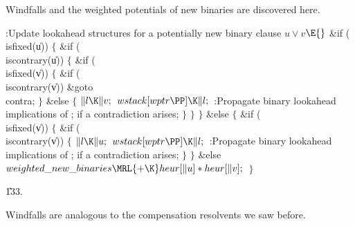 Windfalls and the weighted potentials of new binaries are
discovered here.

\Y\B\4:Update lookahead structures for a potentially new binary clause $u%
\lor v$\X${}\E{}$\6
\&{if} (\\{isfixed}(\|u))\5
${}\{{}$\1\6
\&{if} (\\{iscontrary}(\|u))\5
${}\{{}$\1\6
\&{if} (\\{isfixed}(\|v))\5
${}\{{}$\1\6
\&{if} (\\{iscontrary}(\|v))\1\5
\&{goto} \\{contra};\2\6
\4${}\}{}$\5
\2\&{else}\5
${}\{{}$\1\6
${}\|l\K\|v;{}$\6
${}\\{wstack}[\\{wptr}\PP]\K\|l;{}$\6
:Propagate binary lookahead implications of ;  if a contradiction arises\X;\6
\4${}\}{}$\2\6
\4${}\}{}$\2\6
\4${}\}{}$\5
\2\&{else}\5
${}\{{}$\1\6
\&{if} (\\{isfixed}(\|v))\5
${}\{{}$\1\6
\&{if} (\\{iscontrary}(\|v))\5
${}\{{}$\1\6
${}\|l\K\|u;{}$\6
${}\\{wstack}[\\{wptr}\PP]\K\|l;{}$\6
:Propagate binary lookahead implications of ;  if a contradiction arises\X;\6
\4${}\}{}$\2\6
\4${}\}{}$\5
\2\&{else}\1\5
${}\\{weighted\_new\_binaries}\MRL{+{\K}}\\{heur}[\|u]*\\{heur}[\|v];{}$\2\6
\4${}\}{}$\2\par
\U133.\fi

Windfalls are analogous to the compensation resolvents we
saw before.

